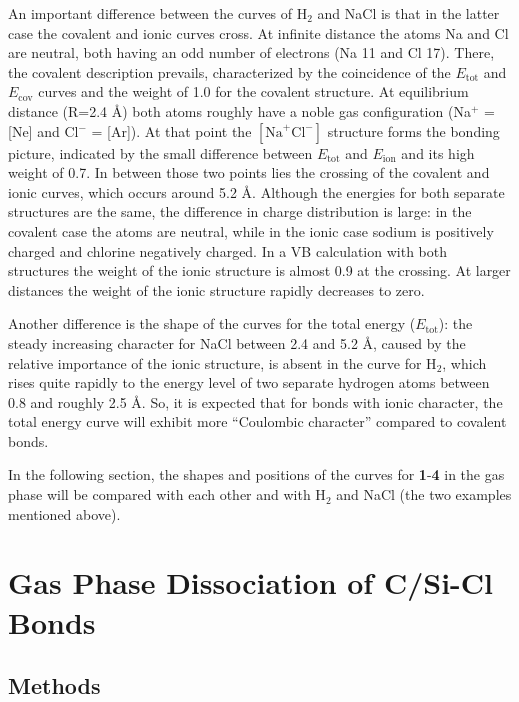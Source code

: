 An important difference between the curves of H$_2$ and NaCl is that in the latter case the covalent and ionic curves cross. At infinite distance the atoms Na and Cl are neutral, both having an odd number of electrons (Na 11 and Cl 17). There, the covalent description prevails, characterized by the coincidence of the $E_\mathrm{tot}$ and $E_\mathrm{cov}$ curves and the weight of 1.0 for the covalent structure. At equilibrium distance (R=2.4 \AA) both atoms roughly have a noble gas configuration (Na$^{+}$ = [Ne] and Cl$^{-}$ = [Ar]). At that point the $[\mathrm{Na}^{+}\mathrm{Cl}^{-}]$ structure forms the bonding picture, indicated by the small difference between $E_\mathrm{tot}$ and $E_\mathrm{ion}$ and its high weight of 0.7. In between those two points lies the crossing of the covalent and ionic curves, which occurs around 5.2 \AA. Although the energies for both separate structures are the same, the difference in charge distribution is large: in the covalent case the atoms are neutral, while in the ionic case sodium is positively charged and chlorine negatively charged. In a VB calculation with both structures the weight of the ionic structure is almost 0.9 at the crossing. At larger distances the weight of the ionic structure rapidly decreases to zero.

Another difference is the shape of the curves for the total energy ($E_\mathrm{tot}$): the steady increasing character for NaCl between 2.4 and 5.2 \AA, caused by the relative importance of the ionic structure, is absent in the curve for H$_2$, which rises quite rapidly to the energy level of two separate hydrogen atoms between 0.8 and roughly 2.5 \AA. So, it is expected that for bonds with ionic character, the total energy curve will exhibit more ``Coulombic character'' compared to covalent bonds. 

In the following section, the shapes and positions of the curves for \textbf{1}-\textbf{4} in the gas phase will be compared with each other and with H$_2$ and NaCl (the two examples mentioned above).

\section{\label{ch3.sec.gasphase}Gas Phase Dissociation of C/Si-Cl Bonds}

\subsection{Methods}

